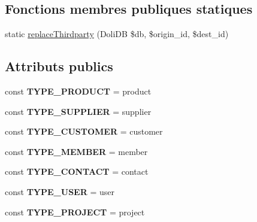 \subsection*{Fonctions membres publiques statiques}
\begin{DoxyCompactItemize}
\item 
static \hyperlink{classCategorie_a6880185641c7a011c64c8ed81722694c}{replace\+Thirdparty} (Doli\+DB \$db, \$origin\+\_\+id, \$dest\+\_\+id)
\end{DoxyCompactItemize}
\subsection*{Attributs publics}
\begin{DoxyCompactItemize}
\item 
\mbox{\label{classCategorie_a33d4c9b680823fe1b602d3a46e2a7ea6}} 
const {\bfseries T\+Y\+P\+E\+\_\+\+P\+R\+O\+D\+U\+CT} = \textquotesingle{}product\textquotesingle{}
\item 
\mbox{\label{classCategorie_a0ec52fb0da47d19c6a29aedecd623720}} 
const {\bfseries T\+Y\+P\+E\+\_\+\+S\+U\+P\+P\+L\+I\+ER} = \textquotesingle{}supplier\textquotesingle{}
\item 
\mbox{\label{classCategorie_a96e97a2a18e3b40ffb085e81d9ed2a83}} 
const {\bfseries T\+Y\+P\+E\+\_\+\+C\+U\+S\+T\+O\+M\+ER} = \textquotesingle{}customer\textquotesingle{}
\item 
\mbox{\label{classCategorie_a4426ae571bf3e34945af80f08d6bda54}} 
const {\bfseries T\+Y\+P\+E\+\_\+\+M\+E\+M\+B\+ER} = \textquotesingle{}member\textquotesingle{}
\item 
\mbox{\label{classCategorie_a5ea36a08fb5ed35b6cebce47cdf05f97}} 
const {\bfseries T\+Y\+P\+E\+\_\+\+C\+O\+N\+T\+A\+CT} = \textquotesingle{}contact\textquotesingle{}
\item 
\mbox{\label{classCategorie_a7a228bfd1dfaa545563c4946987fd118}} 
const {\bfseries T\+Y\+P\+E\+\_\+\+U\+S\+ER} = \textquotesingle{}user\textquotesingle{}
\item 
\mbox{\label{classCategorie_ac5579ea158da7c15b380fe858e97badb}} 
const {\bfseries T\+Y\+P\+E\+\_\+\+P\+R\+O\+J\+E\+CT} = \textquotesingle{}project\textquotesingle{}

\end{DoxyCompactItemize}
